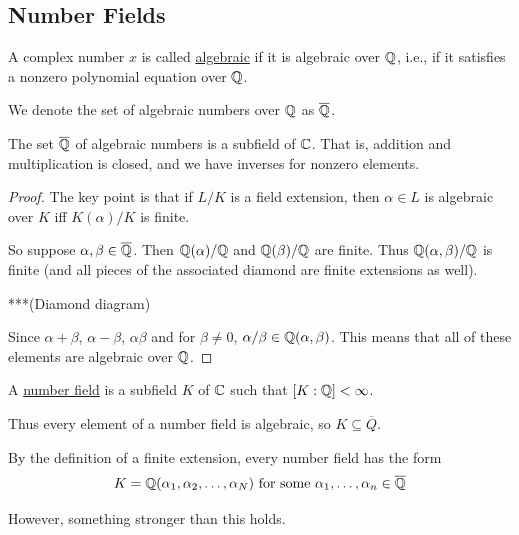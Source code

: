 \subsection{Number Fields}
\begin{definition}
    A complex number $x$ is called \ul{algebraic} if it is algebraic over $\mathbb Q$, i.e., if it satisfies a nonzero polynomial equation over $\mathbb Q$.

    We denote the set of algebraic numbers over $\mathbb Q$ as $\overline{\mathbb Q}$.
\end{definition}
\begin{proposition}
    The set $\overline{\mathbb Q}$ of algebraic numbers is a subfield of $\mathbb C$. That is, addition and multiplication is closed, and we have inverses for nonzero elements.
\end{proposition}
\begin{proof}
    The key point is that if $L / K$ is a field extension, then $\alpha\in L$ is algebraic over $K$ iff $K(\alpha)/K$ is finite.

    So suppose $\alpha, \beta\in\overline{\mathbb Q}$. Then $\mathbb Q(\alpha)/\mathbb Q$ and $\mathbb Q(\beta)/\mathbb Q$ are finite. Thus $\mathbb Q(\alpha, \beta)/\mathbb Q$ is finite (and all pieces of the associated diamond are finite extensions as well).

    ***(Diamond diagram)

    Since $\alpha + \beta$, $\alpha - \beta$, $\alpha\beta$ and for $\beta \neq 0$, $\alpha/\beta \in \mathbb Q(\alpha, \beta)$. This means that all of these elements are algebraic over $\mathbb Q$.
\end{proof}

\begin{definition}
    A \ul{number field} is a subfield $K$ of $\mathbb C$ such that $[K : \mathbb Q] < \infty$.
\end{definition}

Thus every element of a number field is algebraic, so $K\subseteq \overline{Q}$.

By the definition of a finite extension, every number field has the form
\[K = \mathbb Q(\alpha_1, \alpha_2, \dots, \alpha_N)\text{ for some }\alpha_1, \dots, \alpha_n\in\overline{\mathbb Q}\]

However, something stronger than this holds.

